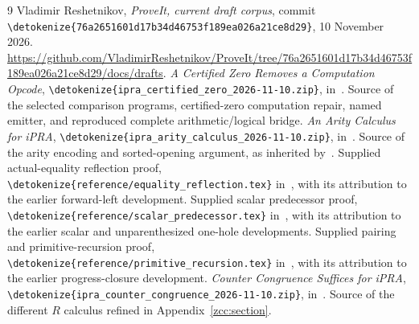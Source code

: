 \documentclass[11pt,letterpaper]{article}
\theoremstyle{definition}\newtheorem{definition}[theorem]{Definition}
\theoremstyle{remark}\newtheorem{remark}[theorem]{Remark}
\newcommand{\file}[1]{\expandafter\nolinkurl\expandafter{\detokenize{#1}}}
\begin{document}
\begin{thebibliography}{9}
 Vladimir Reshetnikov, \emph{ProveIt, current draft corpus},
commit \file{76a2651601d17b34d46753f189ea026a21ce8d29},
10 November 2026.\newline
\url{https://github.com/VladimirReshetnikov/ProveIt/tree/76a2651601d17b34d46753f189ea026a21ce8d29/docs/drafts}.
 \emph{A Certified Zero Removes a Computation Opcode},
\file{ipra_certified_zero_2026-11-10.zip}, in~\cite{snapshot}.
Source of the selected comparison programs, certified-zero computation
repair, named emitter, and reproduced complete arithmetic/logical bridge.
 \emph{An Arity Calculus for iPRA},
\file{ipra_arity_calculus_2026-11-10.zip}, in~\cite{snapshot}.
Source of the arity encoding and sorted-opening argument, as inherited
by~\cite{certified}.
 Supplied actual-equality reflection proof,
\file{reference/equality_reflection.tex} in~\cite{certified}, with its
attribution to the earlier forward-left development.
 Supplied scalar predecessor proof,
\file{reference/scalar_predecessor.tex} in~\cite{certified}, with its
attribution to the earlier scalar and unparenthesized one-hole developments.
 Supplied pairing and primitive-recursion proof,
\file{reference/primitive_recursion.tex} in~\cite{certified}, with its
attribution to the earlier progress-closure development.
 \emph{Counter Congruence Suffices for iPRA},
\file{ipra_counter_congruence_2026-11-10.zip}, in~\cite{snapshot}.
Source of the different $R$ calculus refined in Appendix~\ref{zcc:section}.
\end{thebibliography}
\end{document}
